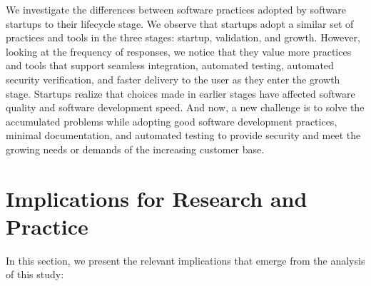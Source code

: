\documentclass[runningheads]{llncs}
\begin{document}

We investigate the differences between software practices adopted by software startups to their lifecycle stage.
We observe that startups adopt a similar set of practices and tools in the three stages: startup, validation, and growth. However, looking at the frequency of responses, we notice that they value more practices and tools that support seamless integration, automated testing, automated security verification, and faster delivery to the user as they enter the growth stage. Startups realize that choices made in earlier stages have affected software quality and software development speed. And now, a new challenge is to solve the accumulated problems while adopting good software development practices, minimal documentation, and automated testing to provide security and meet the growing needs or demands of the increasing customer base.


\section{Implications for Research and Practice} 
\label{section:implications}

In this section, we present the relevant implications that emerge from the analysis of this study:
\end{document}
